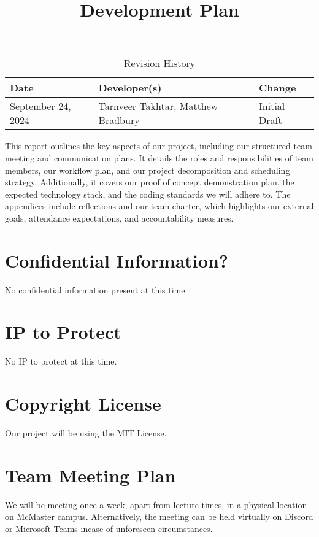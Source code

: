 \documentclass{article}
\title{Development Plan\\\progname}
\author{\authname}
\date{}
\begin{document}
\maketitle

\begin{table}[hp]
\caption{Revision History} \label{TblRevisionHistory}
\begin{tabularx}{\textwidth}{llX}
\toprule
\textbf{Date} & \textbf{Developer(s)} & \textbf{Change}\\
\midrule
September 24, 2024 & Tarnveer Takhtar, Matthew Bradbury & Initial Draft\\
\bottomrule
\end{tabularx}
\end{table}

\newpage{}

This report outlines the key aspects of our project, including our structured 
team meeting and communication plans. It details the roles and responsibilities of team members, 
our workflow plan, and our project decomposition and scheduling strategy. Additionally, it covers our proof of concept demonstration plan, the expected 
technology stack, and the coding standards we will adhere to. The appendices include reflections and our
team charter, which highlights our external goals, attendance expectations, and accountability measures.

\section{Confidential Information?}

No confidential information present at this time.

\section{IP to Protect}

No IP to protect at this time.

\section{Copyright License}
Our project will be using the MIT License.

\section{Team Meeting Plan}

We will be meeting once a week, apart from lecture times, in a physical location on 
McMaster campus. Alternatively, the meeting can be held virtually on Discord or Microsoft Teams incase of
unforeseen circumstances.\\
\end{document}
